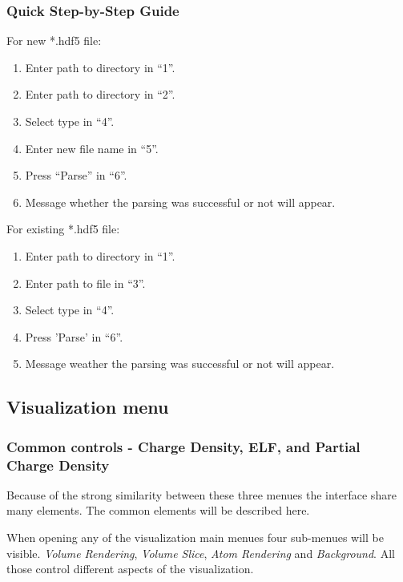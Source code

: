 \subsubsection{Quick Step-by-Step Guide}
For new *.hdf5 file:
\begin{enumerate}
    \item Enter path to directory in ``1''.
    \item Enter path to directory in ``2''.
    \item Select type in ``4''.
    \item Enter new file name in ``5''.
    \item Press ``Parse'' in ``6''.
    \item Message whether the parsing was successful or not will appear.
\end{enumerate}

For existing *.hdf5 file:
\begin{enumerate}
    \item Enter path to directory in ``1''.
    \item Enter path to file in ``3''.
    \item Select type in ``4''.
    \item Press 'Parse' in ``6''.
    \item Message weather the parsing was successful or not will appear.
\end{enumerate}


\subsection{Visualization menu}

\subsubsection{Common controls - Charge Density, ELF, and Partial Charge Density}
Because of the strong similarity between these three menues the interface share many elements. The common elements will be described here.

When opening any of the visualization main menues four sub-menues will be visible. \textit{Volume Rendering}, \textit{Volume Slice}, \textit{Atom Rendering} and \textit{Background}. All those control different aspects of the visualization.

